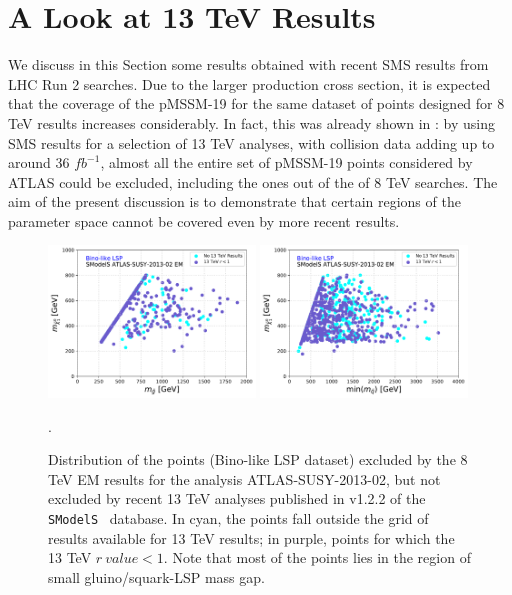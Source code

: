 \documentclass[a4paper,11pt]{article}
\newcommand{\SMO}{\texttt{SModelS\xspace}}
\begin{document}
\section{A Look at 13 TeV Results}\label{ch::13TeV}
We discuss in this Section some results obtained with recent SMS results from LHC Run 2 searches. Due to the larger production cross section, it is expected that the coverage of the pMSSM-19 for the same dataset of points designed for 8 TeV results increases considerably. In fact, this was already shown in \cite{Dutta:2018ioj}: by using SMS results for a selection of 13 TeV analyses, with collision data adding up to around 36 $fb^{-1}$, almost all the entire set of pMSSM-19 points considered by ATLAS could be excluded, including the ones out of the of 8 TeV searches. The aim of the present discussion is to demonstrate that certain regions of the parameter space cannot be covered even by more recent results.
\\
%
\begin{figure}[!h]
	\begin{center}
		\subfigure
		{\includegraphics[width=0.49\textwidth]{PLOTS/13TeV/13TeV_Glu_Neu.pdf}}
		\subfigure
		{\includegraphics[width=0.49\textwidth]{PLOTS/13TeV/13TeV_Sq_Neu.pdf}}
	\end{center}
	\caption{Distribution of the points (Bino-like LSP dataset) excluded by the 8 TeV EM results for the analysis ATLAS-SUSY-2013-02, but not excluded by recent 13 TeV analyses published in v1.2.2 of the \SMO~ database. In cyan, the points fall outside the grid of results available for 13 TeV results; in purple, points for which the 13 TeV $r \ value <1$. Note that most of the points lies in the region of small gluino/squark-LSP mass gap.}. 
	\label{13TEV}
\end{figure}
\end{document}
